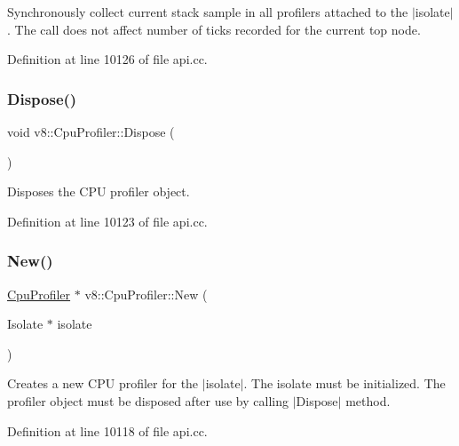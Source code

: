 Synchronously collect current stack sample in all profilers attached to the $\vert$isolate$\vert$. The call does not affect number of ticks recorded for the current top node. 

Definition at line 10126 of file api.\+cc.

\mbox{\label{classv8_1_1CpuProfiler_ab49b3f25a897dc6a359571b3014cd225}} 
\subsubsection{\texorpdfstring{Dispose()}{Dispose()}}
{\footnotesize\ttfamily void v8\+::\+Cpu\+Profiler\+::\+Dispose (\begin{DoxyParamCaption}{ }\end{DoxyParamCaption})}

Disposes the C\+PU profiler object. 

Definition at line 10123 of file api.\+cc.

\mbox{\label{classv8_1_1CpuProfiler_aaeebeaf3f6afb95a8ad6aa08a61e0938}} 
\subsubsection{\texorpdfstring{New()}{New()}}
{\footnotesize\ttfamily \mbox{\hyperlink{classv8_1_1CpuProfiler}{Cpu\+Profiler}} $\ast$ v8\+::\+Cpu\+Profiler\+::\+New (\begin{DoxyParamCaption}\item[{Isolate $\ast$}]{isolate }\end{DoxyParamCaption})\hspace{0.3cm}{\ttfamily [static]}}

Creates a new C\+PU profiler for the $\vert$isolate$\vert$. The isolate must be initialized. The profiler object must be disposed after use by calling $\vert$\+Dispose$\vert$ method. 

Definition at line 10118 of file api.\+cc.

\mbox{\label{classv8_1_1CpuProfiler_ac5b05c72fb899e20adfa7f8cc57f21fb}} 
